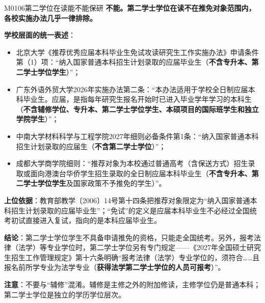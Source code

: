 \begin{qa}{M0106}{第二学位在读能不能保研}
\textbf{不能。第二学士学位在读不在推免对象范围内，各校实施办法几乎一律排除。}

\textbf{学校层面的统一表述}：

\begin{itemize}
  \item 北京大学《推荐优秀应届本科毕业生免试攻读研究生工作实施办法》申请条件第（1）项：“纳入国家普通本科招生计划录取的应届毕业生（\textbf{不含专升本、第二学士学位学生}）”；
  \item 广东外语外贸大学2026年实施办法第二条：“本办法适用于学校全日制应届本科毕业生。应届，是指每年研究生报名开始时已进入毕业学年学习的本科生（\textbf{不含辅修学位、专升本、第二学士学位学生、本硕项目的国际班学生和独立学院学生}）”；
  \item 中南大学材料科学与工程学院2027年细则必备条件第1条：“纳入国家普通本科招生计划录取的应届生（\textbf{不含第二学士学位}）”；
  \item 成都大学商学院细则：“推荐对象为本校通过普通高考（含保送方式）招生录取或面向港澳台华侨学生招生录取的全日制应届本科毕业生（\textbf{不含专升本、第二学士学位学生}及国家政策不予推免的学生）”。
\end{itemize}

\textbf{上位依据}：教育部教学〔2006〕14号第十四条把推荐对象限定为“纳入国家普通本科招生计划录取的应届毕业生”；“免试”的定义是应届本科毕业生不必经过全国统考初试直接进入复试，指向的是本科应届毕业生。

\textbf{结论}：第二学士学位学生不具备申请推免的资格，只能走全国统考。另外，报考法律（法学）等专业学位时，第二学士学位另有专门规定——《2027年全国硕士研究生招生工作管理规定》第十六条明确“报考法律（法学）专业学位的，须符合……且报名前所学专业为法学专业（\textbf{获得法学第二学士学位的人员可报考}）”。

\textbf{注意}：不要与“辅修”混淆。辅修是主修之外的附加修读，主修学位仍是普通本科；第二学士学位是独立的学历学位层次。
\end{qa}

